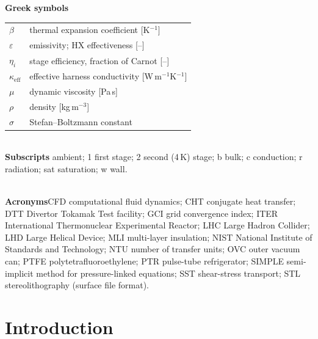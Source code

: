 \documentclass[preprint,12pt]{elsarticle}
\begin{document}
{\begin{minipage}[t]{0.52\textwidth}
\end{minipage}\hfill
\begin{minipage}[t]{0.46\textwidth}
\textbf{Greek symbols}\\[2pt]
\begin{tabular}{@{}p{1.2cm}>{\raggedright\arraybackslash}p{4.4cm}@{}}
$\beta$ & thermal expansion coefficient [K$^{-1}$] \\
$\varepsilon$ & emissivity; HX effectiveness [--] \\
$\eta_i$ & stage efficiency, fraction of Carnot [--] \\
$\kappa_{\mathrm{eff}}$ & effective harness conductivity [W\,m$^{-1}$K$^{-1}$] \\
$\mu$ & dynamic viscosity [Pa\,s] \\
$\rho$ & density [kg\,m$^{-3}$] \\
$\sigma$ & Stefan--Boltzmann constant \\
\end{tabular}\\[6pt]
\noindent\textbf{Subscripts} ambient; 1 first stage; 2 second (4\,K) stage;
b bulk; c conduction; r radiation; sat saturation; w wall.\\[4pt]
\end{minipage}\\[6pt]
\noindent\textbf{Acronyms}\quad CFD computational fluid dynamics; CHT conjugate heat transfer;
DTT Divertor Tokamak Test facility; GCI grid convergence index; ITER International Thermonuclear
Experimental Reactor; LHC Large Hadron Collider; LHD Large Helical Device; MLI multi-layer
insulation; NIST National Institute of Standards and Technology; NTU number of transfer units;
OVC outer vacuum can; PTFE polytetrafluoroethylene; PTR pulse-tube refrigerator; SIMPLE
semi-implicit method for pressure-linked equations; SST shear-stress transport; STL
stereolithography (surface file format).
}


\linenumbers
\section{Introduction}
\label{sec:intro}
\end{document}
